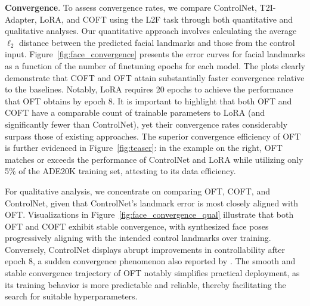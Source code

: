 \textbf{Convergence}. To assess convergence rates, we compare ControlNet, T2I-Adapter, LoRA, and COFT using the L2F task through both quantitative and qualitative analyses. Our quantitative approach involves calculating the average $\ell_2$ distance between the predicted facial landmarks and those from the control input. Figure~\ref{fig:face_convergence} presents the error curves for facial landmarks as a function of the number of finetuning epochs for each model. The plots clearly demonstrate that COFT and OFT attain substantially faster convergence relative to the baselines. Notably, LoRA requires 20 epochs to achieve the performance that OFT obtains by epoch 8. It is important to highlight that both OFT and COFT have a comparable count of trainable parameters to LoRA (and significantly fewer than ControlNet), yet their convergence rates considerably surpass those of existing approaches. The superior convergence efficiency of OFT is further evidenced in Figure~\ref{fig:teaser}: in the example on the right, OFT matches or exceeds the performance of ControlNet and LoRA while utilizing only 5\% of the ADE20K training set, attesting to its data efficiency. 

For qualitative analysis, we concentrate on comparing OFT, COFT, and ControlNet, given that ControlNet’s landmark error is most closely aligned with OFT. Visualizations in Figure~\ref{fig:face_convergence_qual} illustrate that both OFT and COFT exhibit stable convergence, with synthesized face poses progressively aligning with the intended control landmarks over training. Conversely, ControlNet displays abrupt improvements in controllability after epoch 8, a sudden convergence phenomenon also reported by \cite{zhang2023adding}. The smooth and stable convergence trajectory of OFT notably simplifies practical deployment, as its training behavior is more predictable and reliable, thereby facilitating the search for suitable hyperparameters.

